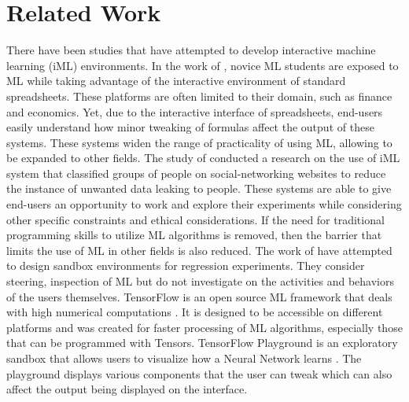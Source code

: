 \documentclass{sigchi-ext}
\begin{document}
\section{Related Work}
There have been studies that have attempted to develop interactive machine learning (iML) environments. In the work of \cite{sarkar2015interactive}, novice ML students are exposed to ML while taking advantage of the interactive environment of standard spreadsheets. These platforms are often limited to their domain, such as finance and economics. Yet, due to the interactive interface of spreadsheets, end-users easily understand how minor tweaking of formulas affect the output of these systems. These systems widen the range of practicality of using ML, allowing to be expanded to other fields. The study of \cite{amershi2012regroup} conducted a research on the use of iML system that classified groups of people on social-networking websites to reduce the instance of unwanted data leaking to people. These systems are able to give end-users an opportunity to work and explore their experiments while considering other specific constraints and ethical considerations. If the need for traditional programming skills to utilize ML algorithms is removed, then the barrier that limits the use of ML in other fields is also reduced. 
The work of \cite{das2019beames, zhao2019featureexplorer} have attempted to design sandbox environments for regression experiments. They consider steering, inspection of ML but do not investigate on the activities and behaviors of the users themselves. TensorFlow is an open source ML framework that deals with high numerical computations \cite{tensorflow_2015}. It is designed to be accessible on different platforms and was created for faster processing of ML algorithms, especially those that can be programmed with Tensors. TensorFlow Playground is an exploratory sandbox that allows users to visualize how a Neural Network learns \cite{tensorflow_2016}. The playground displays various components that the user can tweak which can also affect the output being displayed on the interface.
\end{document}

